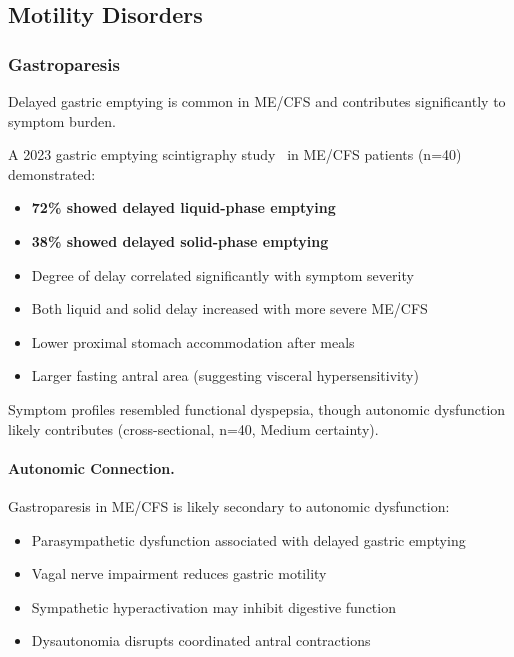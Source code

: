 \subsection{Motility Disorders}

\subsubsection{Gastroparesis}

Delayed gastric emptying is common in ME/CFS and contributes significantly to symptom burden.

\begin{observation}
\label{obs:gastroparesis-prevalence}
A 2023 gastric emptying scintigraphy study~\cite{GastricDysmotility2023} in ME/CFS patients (n=40) demonstrated:
\begin{itemize}
    \item \textbf{72\% showed delayed liquid-phase emptying}
    \item \textbf{38\% showed delayed solid-phase emptying}
    \item Degree of delay correlated significantly with symptom severity
    \item Both liquid and solid delay increased with more severe ME/CFS
    \item Lower proximal stomach accommodation after meals
    \item Larger fasting antral area (suggesting visceral hypersensitivity)
\end{itemize}
Symptom profiles resembled functional dyspepsia, though autonomic dysfunction likely contributes (cross-sectional, n=40, Medium certainty).
\end{observation}

\paragraph{Autonomic Connection.}

Gastroparesis in ME/CFS is likely secondary to autonomic dysfunction:
\begin{itemize}
    \item Parasympathetic dysfunction associated with delayed gastric emptying
    \item Vagal nerve impairment reduces gastric motility
    \item Sympathetic hyperactivation may inhibit digestive function
    \item Dysautonomia disrupts coordinated antral contractions
\end{itemize}

